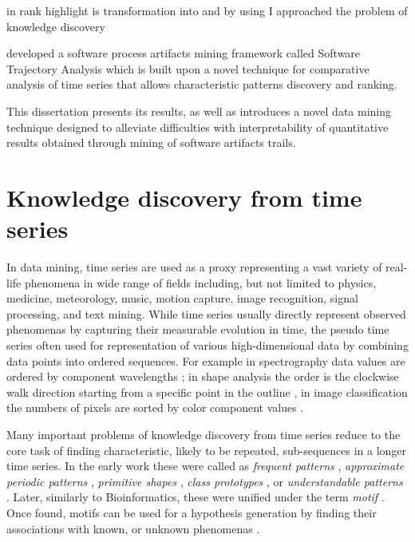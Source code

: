  in rank highlight is  transformation into  and by using I approached the problem of knowledge discovery 

developed a 
software process artifacts mining framework called Software Trajectory Analysis which is built upon 
a novel technique for comparative analysis of time series that allows characteristic patterns discovery 
and ranking.

This dissertation presents its results, as well as introduces a novel data mining technique designed to 
alleviate difficulties with interpretability of quantitative results obtained through mining of software
artifacts trails. 

%
%
\section{Knowledge discovery from time series}\label{section_knowledge_discovery}
In data mining, time series are used as a proxy representing a vast variety of real-life phenomena 
in wide range of fields including, but not limited to physics, medicine, meteorology, 
music, motion capture, image recognition, signal processing, and text mining. 
While time series usually directly represent observed phenomenas by capturing their measurable evolution in time, 
the pseudo time series often used for representation of various high-dimensional data 
by combining data points into ordered sequences. 
For example in spectrography data values are ordered by component wavelengths \cite{citeulike:12550833};
in shape analysis the order is the clockwise walk direction starting from a
specific point in the outline \cite{citeulike:12550835}, in image classification the numbers of pixels
are sorted by color component values \cite{citeulike:2900542}.

Many important problems of knowledge discovery from time series reduce to the core task of finding 
characteristic, likely to be repeated, sub-sequences in a longer time series. 
In the early work these were called as 
\textit{frequent patterns} \cite{citeulike:5159615}, 
\textit{approximate periodic patterns} \cite{citeulike:1959582},
\textit{primitive shapes} \cite{citeulike:5898869}, 
\textit{class prototypes} \cite{citeulike:4406444}, 
or \textit{understandable patterns} \cite{citeulike:3978076}. 
Later, similarly to Bioinformatics, these were unified under the term \textit{motif} \cite{citeulike:3977965}.
Once found, motifs can be used for a hypothesis generation by finding their associations with known,
or unknown phenomenas \cite{citeulike:3977965}. 

